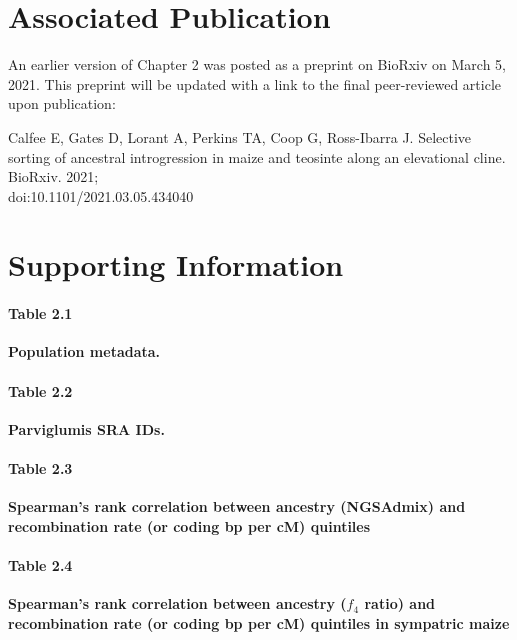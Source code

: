\medskip

\section*{Associated Publication}
An earlier version of Chapter 2 was posted as a preprint on BioRxiv on March 5, 2021. This preprint will be updated with a link to the final peer-reviewed article upon publication: \newline

Calfee E, Gates D, Lorant A, Perkins TA, Coop G, Ross-Ibarra J. Selective sorting of ancestral introgression in maize and teosinte along an elevational cline. BioRxiv. 2021;\\
doi:10.1101/2021.03.05.434040

%


%

\newpage
\section*{Supporting Information}


\paragraph*{Table 2.1}
\label{population_metadata}
{\bf Population metadata.} 

\paragraph*{Table 2.2}
\label{parv50}
{\bf Parviglumis SRA IDs.} 

\paragraph*{Table 2.3}
\label{spearmans_rho_ngsadmix}
{\bf Spearman's rank correlation between \mexicana ancestry (NGSAdmix) and recombination rate (or coding bp per cM) quintiles}


\paragraph*{Table 2.4}
\label{spearmans_rho_f4_sympatric_maize_pop22}
{\bf Spearman's rank correlation between ancestry ($f_4$ ratio) and recombination rate (or coding bp per cM) quintiles in sympatric maize}


